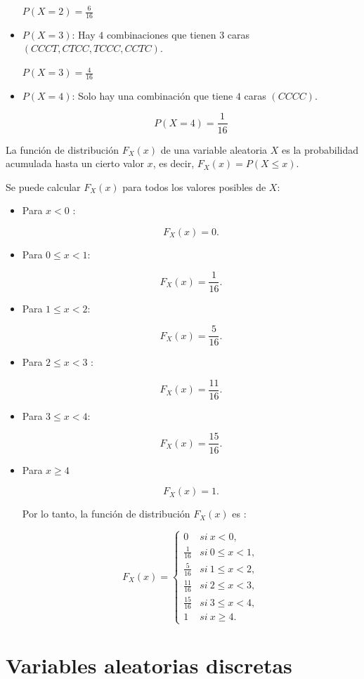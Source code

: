 \documentclass[
  us-letterpaper,
]{scrreprt}
\theoremstyle{plain}
\theoremstyle{plain}
\theoremstyle{definition}
\theoremstyle{remark}
\begin{document}
\begin{tcolorbox}
\begin{itemize}
  \(P(X = 2) = \frac{6}{16}\)
\item
  \(P(X = 3)\): Hay \(4\) combinaciones que tienen \(3\) caras
  \((CCCT, CTCC, TCCC, CCTC)\).

  \(P(X = 3) =\frac{4}{16}\)
\item
  \(P(X =4)\): Solo hay una combinación que tiene \(4\) caras
  \((CCCC)\).

  \[
  P(X = 4) = \frac{1}{16}
  \]
\end{itemize}

La función de distribución \(F_X(x)\) de una variable aleatoria \(X\) es
la probabilidad acumulada hasta un cierto valor \(x\), es decir,
\(F_X(x) = P(X \leq x).\)

Se puede calcular \(F_X(x)\) para todos los valores posibles de \(X\):

\begin{itemize}
\item
  Para \(x<0\) :

  \[F_X(x) = 0.\]
\item
  Para \(0\leq x < 1\):

  \[F_X(x) = \frac{1}{16}.\]
\item
  Para \(1\leq x<2\):

  \[
  F_X(x) = \frac{5}{16}.
  \]
\item
  Para \(2\leq x<3\) :

  \[
  F_X(x) = \frac{11}{16}.
  \]
\item
  Para \(3\leq x<4\):

  \[
  F_X(x) = \frac{15}{16}.
  \]
\item
  Para \(x\geq 4\)

  \[
  F_X(x) = 1.
  \]

  Por lo tanto, la función de distribución \(F_X(x)\) es :

  \[
  F_X(x)= \left\{ \begin{array}{lcc} 0 & si \ x< 0, \\  \frac{1}{16} & si \ 0\leq x<1, \\ \frac{5}{16} & si \ 1\leq x <2,\\ \frac{11}{16} & si \ 2\leq x<3, \\ \frac{15}{16} & si \ 3\leq x <4, \\ 1 & si \ x\geq 4. \end{array} \right.
  \]
\end{itemize}

\end{tcolorbox}

\section{Variables aleatorias
discretas}\label{variables-aleatorias-discretas}
\end{document}
